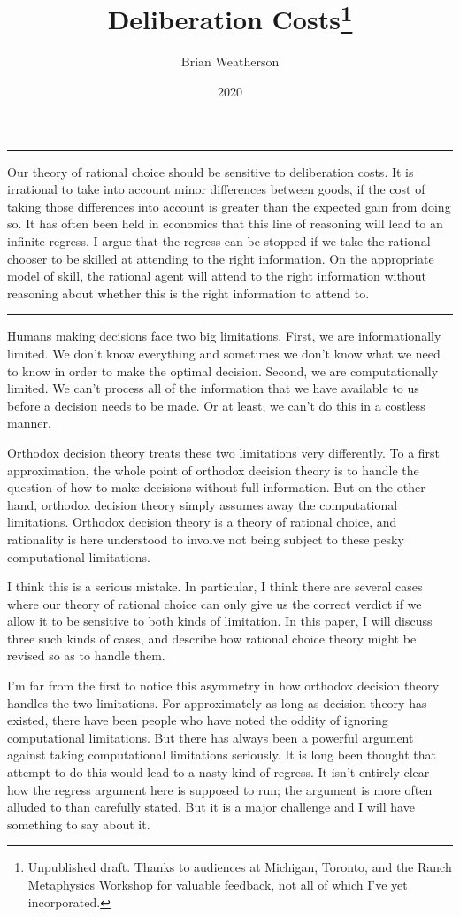 \documentclass[
  10pt,
  letterpaper,
  DIV=11,
  numbers=noendperiod,
  twoside]{scrartcl}
\title{Deliberation Costs\thanks{Unpublished draft. Thanks to audiences
at Michigan, Toronto, and the Ranch Metaphysics Workshop for valuable
feedback, not all of which I've yet incorporated.}}
\author{Brian Weatherson}
\date{2020}
\renewenvironment{abstract}
 {\vspace{-1.25cm}
 \quotation\small\noindent\rule{\linewidth}{.5pt}\par\smallskip
 \noindent }
 {\par\noindent\rule{\linewidth}{.5pt}\endquotation}
\begin{document}
\maketitle
\begin{abstract}
Our theory of rational choice should be sensitive to deliberation costs.
It is irrational to take into account minor differences between goods,
if the cost of taking those differences into account is greater than the
expected gain from doing so. It has often been held in economics that
this line of reasoning will lead to an infinite regress. I argue that
the regress can be stopped if we take the rational chooser to be skilled
at attending to the right information. On the appropriate model of
skill, the rational agent will attend to the right information without
reasoning about whether this is the right information to attend to.
\end{abstract}

Humans making decisions face two big limitations. First, we are
informationally limited. We don't know everything and sometimes we don't
know what we need to know in order to make the optimal decision. Second,
we are computationally limited. We can't process all of the information
that we have available to us before a decision needs to be made. Or at
least, we can't do this in a costless manner.

Orthodox decision theory treats these two limitations very differently.
To a first approximation, the whole point of orthodox decision theory is
to handle the question of how to make decisions without full
information. But on the other hand, orthodox decision theory simply
assumes away the computational limitations. Orthodox decision theory is
a theory of rational choice, and rationality is here understood to
involve not being subject to these pesky computational limitations.

I think this is a serious mistake. In particular, I think there are
several cases where our theory of rational choice can only give us the
correct verdict if we allow it to be sensitive to both kinds of
limitation. In this paper, I will discuss three such kinds of cases, and
describe how rational choice theory might be revised so as to handle
them.

I'm far from the first to notice this asymmetry in how orthodox decision
theory handles the two limitations. For approximately as long as
decision theory has existed, there have been people who have noted the
oddity of ignoring computational limitations. But there has always been
a powerful argument against taking computational limitations seriously.
It is long been thought that attempt to do this would lead to a nasty
kind of regress. It isn't entirely clear how the regress argument here
is supposed to run; the argument is more often alluded to than carefully
stated. But it is a major challenge and I will have something to say
about it.
\end{document}
